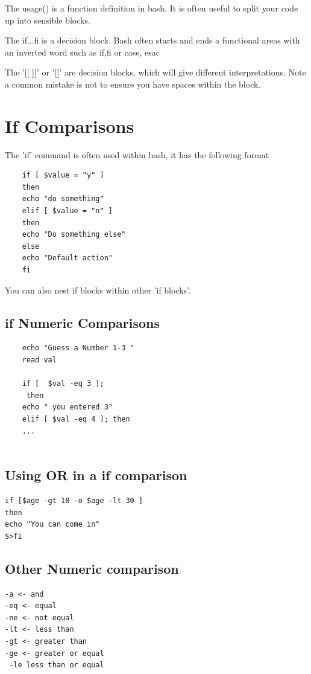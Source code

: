 \documentclass[22pt] {article}
\begin{document}
The usage() is a function definition in bash. It is often useful to split your code up into sensible blocks.

The if...fi is a decision block. Bash often starts and ends a functional areas with an inverted word  such as if,fi or case, esac

The '[[ ]]' or  '[]'  are decision blocks, which will give different interpretations. Note a common mistake is not to ensure you have spaces within the block. 


\pagebreak

	\Huge
	\section{If Comparisons}

\large	
	The 'if' command is often used within bash, it has the following format
	
	\begin{lstlisting}
	if [ $value = "y" ] 
	then
	echo "do something"
	elif [ $value = "n" ] 
	then
	echo "Do something else"
	else
	echo "Default action"
	fi
	\end{lstlisting}
	 
	You can also nest if blocks within other 'if blocks'.
	
\subsection{if Numeric Comparisons}
\begin{lstlisting}
	echo "Guess a Number 1-3 "
	read val

	if [  $val -eq 3 ];
	 then
	echo " you entered 3"
	elif [ $val -eq 4 ]; then                                   
	...
	
\end{lstlisting}


\subsection{Using OR in a  if comparison}
\begin{lstlisting}
if [$age -gt 18 -o $age -lt 30 ]	 
then                  
echo "You can come in"            
$>fi
\end{lstlisting}

\pagebreak
\subsection{Other Numeric comparison }
\begin{lstlisting}
-a <- and
-eq <- equal
-ne <- not equal
-lt <- less than
-gt <- greater than 
-ge <- greater or equal
 -le less than or equal	
\end{lstlisting}
\end{document}
